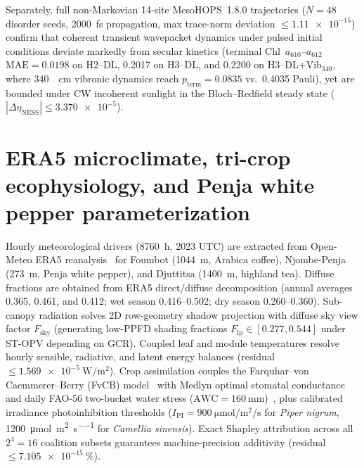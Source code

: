 \documentclass[preprint,12pt,a4paper]{elsarticle}
\begin{document}
Separately, full non-Markovian 14-site MesoHOPS~1.8.0 trajectories ($N=48$ disorder seeds, \qty{2000}{\femto\second} propagation, max trace-norm deviation $\le \num{1.11e-15}$) confirm that coherent transient wavepacket dynamics under pulsed initial conditions deviate markedly from secular kinetics (terminal Chl~$a_{610}$--$a_{612}$ $\mathrm{MAE} = \num{0.0198}$ on H2--DL, \num{0.2017} on H3--DL, and \num{0.2200} on H3--DL+Vib$_{340}$, where \qty{340}{\per\centi\meter} vibronic dynamics reach $p_{\mathrm{term}} = \num{0.0835}$ vs.\ \num{0.4035} Pauli), yet are bounded under CW incoherent sunlight in the Bloch--Redfield steady state ($|\Delta\eta_{\mathrm{NESS}}| \le \num{3.370e-5}$).

\section{ERA5 microclimate, tri-crop ecophysiology, and Penja white pepper parameterization}
\label{sec:sm_agro}

Hourly meteorological drivers (\qty{8760}{\hour}, 2023 UTC) are extracted from Open-Meteo ERA5 reanalysis~\cite{Hersbach2020} for Foumbot (\qty{1044}{\meter}, Arabica coffee), Njombe-Penja (\qty{273}{\meter}, Penja white pepper), and Djuttitsa (\qty{1400}{\meter}, highland tea). Diffuse fractions are obtained from ERA5 direct/diffuse decomposition (annual averages \num{0.365}, \num{0.461}, and \num{0.412}; wet season \numrange{0.416}{0.502}; dry season \numrange{0.260}{0.360}). Sub-canopy radiation solves 2D row-geometry shadow projection with diffuse sky view factor $F_{\mathrm{sky}}$ (generating low-PPFD shading fractions $F_{\mathrm{lp}} \in [\num{0.277}, \num{0.544}]$ under ST-OPV depending on $\mathrm{GCR}$). Coupled leaf and module temperatures resolve hourly sensible, radiative, and latent energy balances (residual $\le \qty{1.569e-5}{\watt\per\square\meter}$). Crop assimilation couples the Farquhar--von Caemmerer--Berry (FvCB) model~\cite{Farquhar1980} with Medlyn optimal stomatal conductance~\cite{Medlyn2011} and daily FAO-56 two-bucket water stress ($\mathrm{AWC}=\qty{160}{\milli\meter}$)~\cite{Allen1998}, plus calibrated irradiance photoinhibition thresholds ($I_{\mathrm{PI}} = \qty{900}{\micro\mole\per\square\meter\per\second}$ for \textit{Piper nigrum}, \qty{1200}{\micro\mole\per\square\meter\per\second} for \textit{Camellia sinensis}). Exact Shapley attribution across all $2^4=16$ coalition subsets guarantees machine-precision additivity (residual $\le \qty{7.105e-15}{\percent}$).
\end{document}
